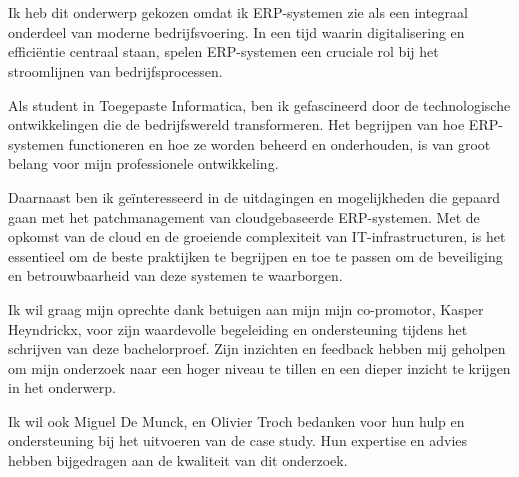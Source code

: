 
\chapter*{}%
\label{ch:voorwoord}



Ik heb dit onderwerp gekozen omdat ik ERP-systemen zie als een integraal onderdeel van moderne bedrijfsvoering. In een tijd waarin digitalisering en efficiëntie centraal staan, spelen ERP-systemen een cruciale rol bij het stroomlijnen van bedrijfsprocessen.

Als student in Toegepaste Informatica, ben ik gefascineerd door de technologische ontwikkelingen die de bedrijfswereld transformeren. Het begrijpen van hoe ERP-systemen functioneren en hoe ze worden beheerd en onderhouden, is van groot belang voor mijn professionele ontwikkeling.

Daarnaast ben ik geïnteresseerd in de uitdagingen en mogelijkheden die gepaard gaan met het patchmanagement van cloudgebaseerde ERP-systemen. Met de opkomst van de cloud en de groeiende complexiteit van IT-infrastructuren, is het essentieel om de beste praktijken te begrijpen en toe te passen om de beveiliging en betrouwbaarheid van deze systemen te waarborgen.

Ik wil graag mijn oprechte dank betuigen aan mijn mijn co-promotor, Kasper Heyndrickx, voor zijn waardevolle begeleiding en ondersteuning tijdens het schrijven van deze bachelorproef. Zijn inzichten en feedback hebben mij geholpen om mijn onderzoek naar een hoger niveau te tillen en een dieper inzicht te krijgen in het onderwerp. 

Ik wil ook Miguel De Munck, en Olivier Troch bedanken voor hun hulp en ondersteuning bij het uitvoeren van de case study. Hun expertise en advies hebben bijgedragen aan de kwaliteit van dit onderzoek.

